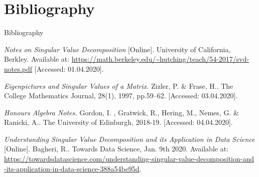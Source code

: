 \documentclass[notes]{beamer}
\begin{document}
\section{Bibliography}
\begin{frame}{Bibliography}
\begin{thebibliography}{}
     \textit{Notes on Singular Value Decomposition} [Online]. University of California, Berkley. Available at: \url{https://math.berkeley.edu/~hutching/teach/54-2017/svd-notes.pdf} [Accessed: 01.04.2020].

     \textit{Eigenpictures and Singular Values of a Matrix.}
    Zizler, P. & Frase, H.. The College Mathematics Journal, 28(1), 1997, pp.59–62. [Accessed: 03.04.2020].

     \textit{Honours Algebra Notes.} Gordon, I. , Gratwick, R., Hering, M., Nemes, G. & Ranicki, A.. The University of Edinburgh, 2018-19. [Accessed: 04.04.2020].
    
     \textit{Understanding Singular Value Decomposition and its Application in Data Science} [Online]. Bagheri, R.. Towards Data Science, Jan. 9th 2020. Available at: \url{https://towardsdatascience.com/understanding-singular-value-decomposition-and} \url{-its-application-in-data-science-388a54be95d}.
\end{thebibliography}
\end{frame}
\end{document}
